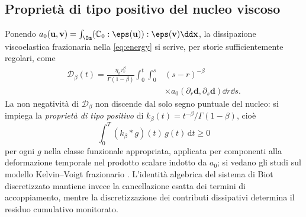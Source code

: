 \subsection*{Propriet\`a di tipo positivo del nucleo viscoso}
Ponendo $a_0(\mathbf u,\mathbf v)=\int_\Om(\mathbb C_0:\eps(\mathbf u)):\eps(\mathbf v)\dd\mathbf x$, la dissipazione viscoelastica frazionaria nella \eqref{eq:energy} si scrive, per storie sufficientemente regolari, come
\begin{equation}\label{eq:app-viscous-positive}
\begin{aligned}
\mathcal D_\beta(t)=\frac{\eta_v\tau_v^\beta}{\Gamma(1-\beta)}
\int_0^t\!\int_0^s&(s-r)^{-\beta}\\[-2pt]
&\times a_0(\partial_r\mathbf d,\partial_s\mathbf d)\dd r\dd s.
\end{aligned}
\end{equation}
La non negativit\`a di $\mathcal D_\beta$ non discende dal solo segno puntuale del nucleo: si impiega la \emph{propriet\`a di tipo positivo} di $k_\beta(t)=t^{-\beta}/\Gamma(1-\beta)$, cio\`e
\begin{equation}\label{eq:positive-type}
\int_0^T(k_\beta*g)(t)\,g(t)\,\mathrm dt\ge0
\end{equation}
per ogni $g$ nella classe funzionale appropriata, applicata per componenti alla deformazione temporale nel prodotto scalare indotto da $a_0$; si vedano gli studi sul modello Kelvin--Voigt frazionario \citep{caponi2021sapio,bociu2023mathematical}. L'identit\`a algebrica del sistema di Biot discretizzato mantiene invece la cancellazione esatta dei termini di accoppiamento, mentre la discretizzazione dei contributi dissipativi determina il residuo cumulativo monitorato.
